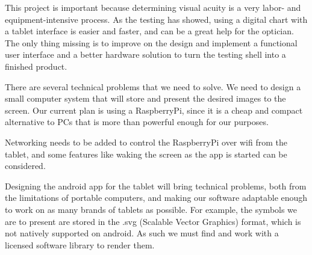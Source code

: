 \documentclass{article}
\begin{document}




This project is important because determining visual acuity is a very labor- and equipment-intensive process. As the testing has showed, using a digital chart with a tablet interface is easier and faster, and can be a great help for the optician. The only thing missing is to improve on the design and implement a functional user interface and a better hardware solution to turn the testing shell into a finished product. 









There are several technical problems that we need to solve. We need to design a small computer system that will store and present the desired images to the screen. Our current plan is using a RaspberryPi, since it is a cheap and compact alternative to PCs that is more than powerful enough for our purposes. 

Networking needs to be added to control the RaspberryPi over wifi from the tablet, and some features like waking the screen as the app is started can be considered.

Designing the android app for the tablet will bring technical problems, both from the limitations of portable computers, and making our software adaptable enough to work on as many brands of tablets as possible. For example, the symbols we are to present are stored in the .svg (Scalable Vector Graphics) format, which is not natively supported on android. As such we must find and work with a licensed software library to render them. 
\end{document}
